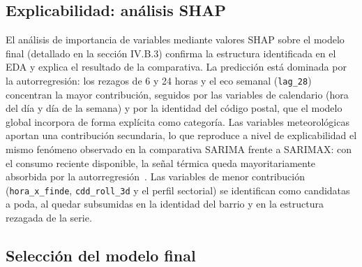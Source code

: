\documentclass[12pt, a4paper]{article}
\begin{document}
\subsection{Explicabilidad: análisis SHAP}


El análisis de importancia de variables mediante valores SHAP sobre el modelo final (detallado en la sección IV.B.3) confirma la estructura identificada en el EDA y explica el resultado de la comparativa. La predicción está dominada por la autorregresión: los rezagos de 6 y 24 horas y el eco semanal (\texttt{lag\_28}) concentran la mayor contribución, seguidos por las variables de calendario (hora del día y día de la semana) y por la identidad del código postal, que el modelo global incorpora de forma explícita como categoría. Las variables meteorológicas aportan una contribución secundaria, lo que reproduce a nivel de explicabilidad el mismo fenómeno observado en la comparativa SARIMA frente a SARIMAX: con el consumo reciente disponible, la señal térmica queda mayoritariamente absorbida por la autorregresión~\cite{pardo2002}. Las variables de menor contribución (\texttt{hora\_x\_finde}, \texttt{cdd\_roll\_3d} y el perfil sectorial) se identifican como candidatas a poda, al quedar subsumidas en la identidad del barrio y en la estructura rezagada de la serie.

\subsection{Selección del modelo final}
\end{document}
